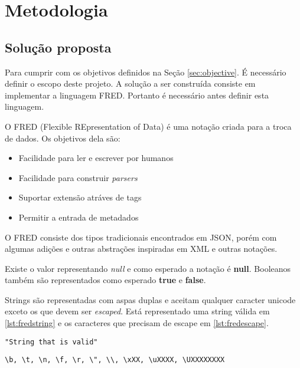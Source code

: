 \chapter[Metodologia]{Metodologia}

\section{Solução proposta}

Para cumprir com os objetivos definidos na Seção \ref{sec:objective}. É necessário definir
o escopo deste projeto. A solução a ser construída consiste em implementar a linguagem FRED.
Portanto é necessário antes definir esta linguagem.

O FRED (Flexible REpresentation of Data) é uma notação criada para a troca de dados. Os
objetivos dela são:

\begin{itemize}
    \item Facilidade para ler e escrever por humanos
    \item Facilidade para construir \textit{parsers}
    \item Suportar extensão atráves de tags
    \item Permitir a entrada de metadados
\end{itemize}

O FRED consiste dos tipos tradicionais encontrados em JSON, porém com algumas adições e outras abstrações
inspiradas em XML e outras notações.

Existe o valor representando \textit{null} e como esperado a notação é  \textbf{null}. Booleanos
também são representados como esperado \textbf{true} e \textbf{false}.

Strings são representadas com aspas duplas e aceitam qualquer caracter unicode 
exceto os que devem ser \textit{escaped}. Está representado uma string válida em \ref{lst:fredstring} 
e os caracteres que precisam de escape em \ref{lst:fredescape}.

\begin{lstlisting}[caption=Exemplo de String em FRED,label={lst:fredstring}]
"String that is valid"
\end{lstlisting}

\begin{lstlisting}[caption=Caracteres que devem ser escaped,label={lst:fredescape}]
\b, \t, \n, \f, \r, \", \\, \xXX, \uXXXX, \UXXXXXXXX
\end{lstlisting}

